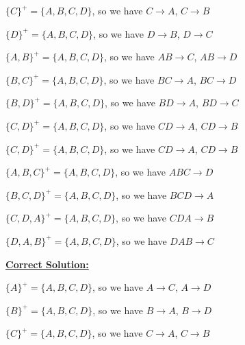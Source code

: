 \documentclass[12pt]{article}
\begin{document}
\begin{enumerate}[1.]
\begin{enumerate}[i)]
\begin{enumerate}[a)]
            \bigskip

            $\{C\}^+ = \{A,B,C,D\}$, so we have $C \to A$, $C \to B$

            \bigskip

            $\{D\}^+ = \{A,B,C,D\}$, so we have $D \to B$, $D \to C$

            \bigskip

            $\{A,B\}^+ = \{A,B,C,D\}$, so we have $AB \to C$, $AB \to D$

            \bigskip

            $\{B,C\}^+ = \{A,B,C,D\}$, so we have $BC \to A$, $BC \to D$

            \bigskip

            $\{B,D\}^+ = \{A,B,C,D\}$, so we have $BD \to A$, $BD \to C$

            \bigskip

            $\{C,D\}^+ = \{A,B,C,D\}$, so we have $CD \to A$, $CD \to B$

            \bigskip

            $\{C,D\}^+ = \{A,B,C,D\}$, so we have $CD \to A$, $CD \to B$

            \bigskip

            $\{A,B,C\}^+ = \{A,B,C,D\}$, so we have $ABC \to D$

            \bigskip

            $\{B,C,D\}^+ = \{A,B,C,D\}$, so we have $BCD \to A$

            \bigskip

            $\{C,D,A\}^+ = \{A,B,C,D\}$, so we have $CDA \to B$

            \bigskip

            $\{D,A,B\}^+ = \{A,B,C,D\}$, so we have $DAB \to C$

            \bigskip

            \begin{mdframed}
                \underline{\textbf{Correct Solution:}}

                $\{A\}^+ = \{A,B,C,D\}$, so we have $A \to C$, $A \to D$

                \bigskip

                $\{B\}^+ = \{A,B,C,D\}$, so we have $B \to A$, $B \to D$

                \bigskip

                $\{C\}^+ = \{A,B,C,D\}$, so we have $C \to A$, $C \to B$

                \bigskip


\end{mdframed}
\end{enumerate}
\end{enumerate}
\end{enumerate}
\end{document}
